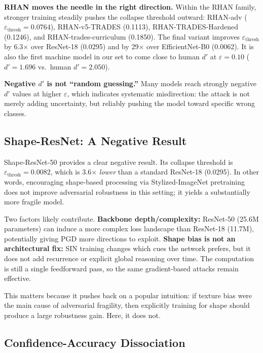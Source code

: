 \documentclass[12pt,a4paper]{article}
\begin{document}
\textbf{RHAN moves the needle in the right direction.} Within the RHAN family,
stronger training steadily pushes the collapse threshold outward: RHAN-adv
($\varepsilon_{\text{thresh}}{=}0.0764$), RHAN-v5-TRADES (0.1113),
RHAN-TRADES-Hardened (0.1246), and RHAN-trades-curriculum (0.1850). The final
variant improves $\varepsilon_{\text{thresh}}$ by 6.3$\times$ over ResNet-18
(0.0295) and by 29$\times$ over EfficientNet-B0 (0.0062). It is also the first
machine model in our set to come close to human $d'$ at $\varepsilon{=}0.10$
($d'{=}1.696$ vs.\ human $d'{=}2.050$).

\textbf{Negative $d'$ is not ``random guessing.''} Many models reach strongly
negative $d'$ values at higher $\varepsilon$, which indicates systematic
misdirection: the attack is not merely adding uncertainty, but reliably pushing
the model toward specific wrong classes.

\subsection{Shape-ResNet: A Negative Result}

Shape-ResNet-50 provides a clear negative result. Its collapse threshold is
$\varepsilon_{\text{thresh}}{=}0.0082$, which is 3.6$\times$ \emph{lower} than a
standard ResNet-18 (0.0295). In other words, encouraging shape-based processing
via Stylized-ImageNet pretraining does not improve adversarial robustness in
this setting; it yields a substantially more fragile model.

Two factors likely contribute. \textbf{Backbone depth/complexity:} ResNet-50
(25.6M parameters) can induce a more complex loss landscape than ResNet-18
(11.7M), potentially giving PGD more directions to exploit. \textbf{Shape bias is
not an architectural fix:} SIN training changes which cues the network prefers,
but it does not add recurrence or explicit global reasoning over time. The
computation is still a single feedforward pass, so the same gradient-based
attacks remain effective.

This matters because it pushes back on a popular intuition: if texture bias were
the main cause of adversarial fragility, then explicitly training for shape
should produce a large robustness gain. Here, it does not.

\subsection{Confidence-Accuracy Dissociation}
\end{document}
